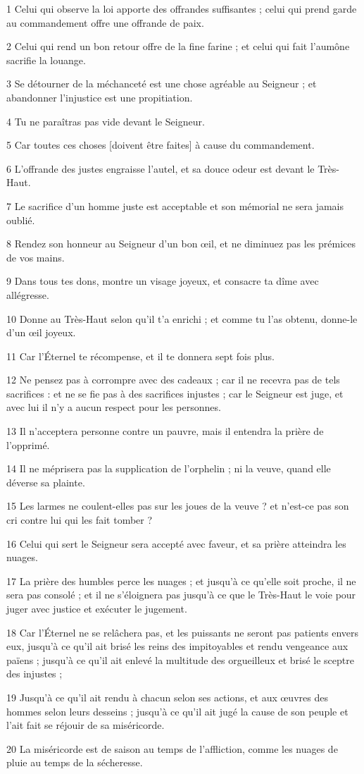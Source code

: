 \par 1 Celui qui observe la loi apporte des offrandes suffisantes ; celui qui prend garde au commandement offre une offrande de paix.
\par 2 Celui qui rend un bon retour offre de la fine farine ; et celui qui fait l'aumône sacrifie la louange.
\par 3 Se détourner de la méchanceté est une chose agréable au Seigneur ; et abandonner l'injustice est une propitiation.
\par 4 Tu ne paraîtras pas vide devant le Seigneur.
\par 5 Car toutes ces choses [doivent être faites] à cause du commandement.
\par 6 L'offrande des justes engraisse l'autel, et sa douce odeur est devant le Très-Haut.
\par 7 Le sacrifice d'un homme juste est acceptable et son mémorial ne sera jamais oublié.
\par 8 Rendez son honneur au Seigneur d'un bon œil, et ne diminuez pas les prémices de vos mains.
\par 9 Dans tous tes dons, montre un visage joyeux, et consacre ta dîme avec allégresse.
\par 10 Donne au Très-Haut selon qu'il t'a enrichi ; et comme tu l'as obtenu, donne-le d'un œil joyeux.
\par 11 Car l'Éternel te récompense, et il te donnera sept fois plus.
\par 12 Ne pensez pas à corrompre avec des cadeaux ; car il ne recevra pas de tels sacrifices : et ne se fie pas à des sacrifices injustes ; car le Seigneur est juge, et avec lui il n'y a aucun respect pour les personnes.
\par 13 Il n'acceptera personne contre un pauvre, mais il entendra la prière de l'opprimé.
\par 14 Il ne méprisera pas la supplication de l'orphelin ; ni la veuve, quand elle déverse sa plainte.
\par 15 Les larmes ne coulent-elles pas sur les joues de la veuve ? et n'est-ce pas son cri contre lui qui les fait tomber ?
\par 16 Celui qui sert le Seigneur sera accepté avec faveur, et sa prière atteindra les nuages.
\par 17 La prière des humbles perce les nuages ​​; et jusqu'à ce qu'elle soit proche, il ne sera pas consolé ; et il ne s'éloignera pas jusqu'à ce que le Très-Haut le voie pour juger avec justice et exécuter le jugement.
\par 18 Car l'Éternel ne se relâchera pas, et les puissants ne seront pas patients envers eux, jusqu'à ce qu'il ait brisé les reins des impitoyables et rendu vengeance aux païens ; jusqu'à ce qu'il ait enlevé la multitude des orgueilleux et brisé le sceptre des injustes ;
\par 19 Jusqu'à ce qu'il ait rendu à chacun selon ses actions, et aux œuvres des hommes selon leurs desseins ; jusqu'à ce qu'il ait jugé la cause de son peuple et l'ait fait se réjouir de sa miséricorde.
\par 20 La miséricorde est de saison au temps de l'affliction, comme les nuages ​​de pluie au temps de la sécheresse.


